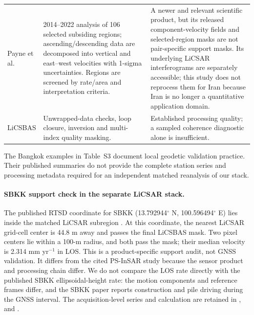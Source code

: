 \documentclass[10pt,a4paper]{article}
\begin{document}
\begin{longtable}{p{.24\linewidth}p{.38\linewidth}p{.3\linewidth}}
Payne et al. \citep{payne2025iran,payne2024data} & 2014--2022 analysis of 106 selected subsiding regions; ascending/descending data are decomposed into vertical and east--west velocities with 1-sigma uncertainties. Regions are screened by rate/area and interpretation criteria. & A newer and relevant scientific product, but its released component-velocity fields and selected-region masks are not pair-specific support masks. Its underlying LiCSAR interferograms are separately accessible; this study does not reprocess them for Iran because Iran is no longer a quantitative application domain.\\
LiCSBAS \citep{morishita2020licsbas} & Unwrapped-data checks, loop closure, inversion and multi-index quality masking. & Established processing quality; a sampled coherence diagnostic alone is insufficient.\\\bottomrule
\end{longtable}
\normalsize

The Bangkok examples in Table~S3 document local geodetic validation practice. Their published summaries do not provide the complete station series and processing metadata required for an independent matched reanalysis of our stack.

\paragraph{SBKK support check in the separate LiCSAR stack.} The published RTSD coordinate for SBKK (13.792944$^\circ$ N, 100.596494$^\circ$ E) lies inside the matched LiCSAR subregion \citep{jica2024thailandcors}. At this coordinate, the nearest LiCSAR grid-cell center is 44.8 m away and passes the final LiCSBAS mask. Two pixel centers lie within a 100-m radius, and both pass the mask; their median velocity is 2.314 mm yr$^{-1}$ in LOS. This is a product-specific support audit, not GNSS validation. It differs from the cited PS-InSAR study because the sensor product and processing chain differ. We do not compare the LOS rate directly with the published SBKK ellipsoidal-height rate: the motion components and reference frames differ, and the SBKK paper reports construction and pile driving during the GNSS interval. The acquisition-level series and calculation are retained in ,  and .
\end{document}
